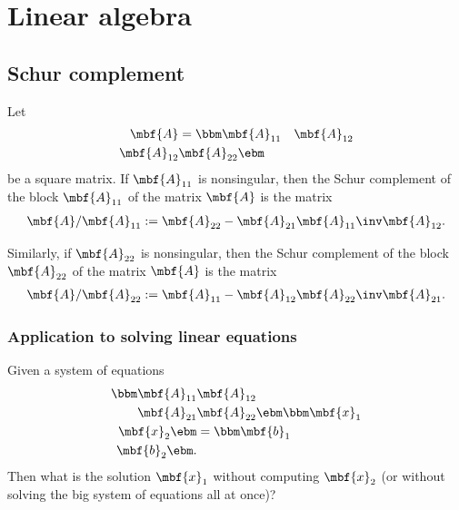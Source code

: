 \chapter{Linear algebra}
\section{Schur complement}
\begin{mytheorem}    
    Let 
    \begin{align}
        \mbf{A} &= 
        \bbm
            \mbf{A}_{11} & \mbf{A}_{12}\\
            \mbf{A}_{12} & \mbf{A}_{22}
        \ebm
    \end{align}
    be a square matrix. If $\mbf{A}_{11}$ is nonsingular, then the Schur complement of the block $\mbf{A}_{11}$ of the matrix $\mbf{A}$ is the matrix
    \begin{align}
        \mbf{A}/\mbf{A}_{11} := \mbf{A}_{22} - \mbf{A}_{21}\mbf{A}_{11}\inv\mbf{A}_{12}.
    \end{align}
    
    Similarly, if $\mbf{A}_{22}$ is nonsingular, then the Schur complement of the block $\mbf{A}_{22}$ of the matrix $\mbf{A}$ is the matrix
    \begin{align}
        \mbf{A}/\mbf{A}_{22} := \mbf{A}_{11} - \mbf{A}_{12}\mbf{A}_{22}\inv\mbf{A}_{21}.
    \end{align}
\end{mytheorem}

\subsection{Application to solving linear equations}
Given a system of equations 
\begin{align}
    \label{eq:schur solving lin system application}
    \bbm
            \mbf{A}_{11} & \mbf{A}_{12}\\
            \mbf{A}_{21} & \mbf{A}_{22}
    \ebm
    \bbm \mbf{x}_{1}\\\mbf{x}_{2} \ebm 
    &=
    \bbm \mbf{b}_{1} \\\mbf{b}_{2} \ebm.
\end{align}
Then what is the solution $\mbf{x}_{1}$ without computing $\mbf{x}_{2}$ (or without solving the big system of equations all at once)?

